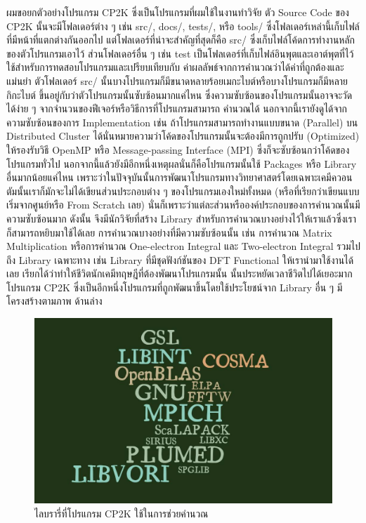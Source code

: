 ผมขอยกตัวอย่างโปรแกรม CP2K ซึ่งเป็นโปรแกรมที่ผมใช้ในงานทำวิจัย ตัว Source Code ของ CP2K นั้นจะมีโฟลเดอร์ต่าง ๆ เช่น src/, docs/, 
tests/, หรือ tools/ ซึ่งโฟลเดอร์เหล่านี้เก็บไฟล์ที่มีหน้าที่แตกต่างกันออกไป แต่โฟลเดอร์ที่น่าจะสำคัญที่สุดก็คือ src/ ซึ่งเก็บไฟล์โค้ดการทำงานหลัก%
ของตัวโปรแกรมเอาไว้ ส่วนโฟลเดอร์อื่น ๆ เช่น test เป็นโฟลเดอร์ที่เก็บไฟล์อินพุตและเอาต์พุตที่ไว้ใช้สำหรับการทดสอบโปรแกรมและเปรียบเทียบกับ%
ค่าผลลัพธ์จากการคำนวณว่าได้ค่าที่ถูกต้องและแม่นยำ ตัวโฟลเดอร์ src/ นั้นบางโปรแกรมก็มีขนาดหลายร้อยเมกะไบต์หรือบางโปรแกรมก็มีหลายกิกะไบต์ 
ขึ้นอยู่กับว่าตัวโปรแกรมนั้นซับซ้อนมากแค่ไหน ซึ่งความซับซ้อนของโปรแกรมนั้นอาจจะวัดได้ง่าย ๆ จากจำนวนของฟีเจอร์หรือวิธีการที่โปรแกรมสามารถ%
คำนวณได้ นอกจากนี้เรายังดูได้จากความซับซ้อนของการ Implementation เช่น ถ้าโปรแกรมสามารถทำงานแบบขนาด (Parallel) บน Distributed 
Cluster ได้นั่นหมายความว่าโค้ดของโปรแกรมนั้นจะต้องมีการถูกปรับ (Optimized) ให้รองรับวิธี OpenMP หรือ Message-passing Interface 
(MPI) ซึ่งก็จะซับซ้อนกว่าโค้ดของโปรแกรมทั่วไป นอกจากนี้แล้วยังมีอีกหนึ่งเหตุผลนั่นก็คือโปรแกรมนั้นใช้ Packages หรือ Library อื่นมากน้อยแค่ไหน 
เพราะว่าในปัจจุบันนั้นการพัฒนาโปรแกรมทางวิทยาศาสตร์โดยเฉพาะเคมีควอนตัมนั้นเราก็มักจะไม่ได้เขียนส่วนประกอบต่าง ๆ ของโปรแกรมเองใหม่ทั้งหมด 
(หรือที่เรียกว่าเขียนแบบเริ่มจากศูนย์หรือ From Scratch เลย) นั่นก็เพราะว่าแต่ละส่วนหรือองค์ประกอบของการคำนวณนั้นมีความซับซ้อนมาก ดังนั้น%
จึงมีนักวิจัยที่สร้าง Library สำหรับการคำนวณบางอย่างไว้ให้เราแล้วซึ่งเราก็สามารถหยิบมาใช้ได้เลย การคำนวณบางอย่างที่มีความซับซ้อนนั้น เช่น 
การคำนวณ Matrix Multiplication หรือการคำนวณ One-electron Integral และ Two-electron Integral รวมไปถึง Library 
เฉพาะทาง เช่น Library ที่มีชุดฟังก์ชันของ DFT Functional ให้เรานำมาใช้งานได้เลย เรียกได้ว่าทำให้ชีวิตนักเคมีทฤษฎีที่ต้องพัฒนาโปรแกรมนั้น%
นั้นประหยัดเวลาชีวิตไปได้เยอะมาก โปรแกรม CP2K ซึ่งเป็นอีกหนึ่งโปรแกรมที่ถูกพัฒนาขึ้นโดยใช้ประโยชน์จาก Library อื่น ๆ มีโครงสร้างตามภาพ%
ด้านล่าง 

\begin{figure}[htbp]
    \centering
    \includegraphics[width=0.7\linewidth]{fig/cp2k-lib.jpg}
    \caption{ไลบรารี่ที่โปรแกรม CP2K ใช้ในการช่วยคำนวณ}
    \label{fig:cp2k_lib}
\end{figure}


